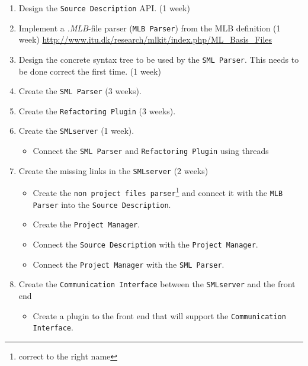 \documentclass[a4paper,oneside]{memoir}
\begin{document}
\begin{enumerate}
\item Design the \texttt{Source Description} API. (1 week)

\item Implement a \textit{.MLB}-file parser (\texttt{MLB Parser}) from the MLB
  definition (1 week) 
\url{http://www.itu.dk/research/mlkit/index.php/ML_Basis_Files}

\item Design the concrete syntax tree to be used by the \texttt{SML
    Parser}. This needs to be done correct the first time. (1 week)

\item Create the \texttt{SML Parser} (3 weeks).

\item Create the \texttt{Refactoring Plugin} (3 weeks).

\item Create the \texttt{SMLserver} (1 week).
  \begin{itemize}
  \item Connect the \texttt{SML Parser} and \texttt{Refactoring Plugin} using threads
  \end{itemize}

\item Create the missing links in the \texttt{SMLserver} (2 weeks)
  \begin{itemize}
  \item Create the \texttt{non project files parser}\footnote{correct to the
      right name} and connect it with the \texttt{MLB Parser} into the
    \texttt{Source Description}.

  \item Create the \texttt{Project Manager}.

  \item Connect the \texttt{Source Description} with the \texttt{Project
      Manager}.

  \item Connect the \texttt{Project Manager} with the \texttt{SML Parser}.
  \end{itemize}

\item Create the \texttt{Communication Interface} between the \texttt{SMLserver}
  and the front end
  \begin{itemize}
  \item Create a plugin to the front end that will support the
    \texttt{Communication Interface}.
  \end{itemize}
\end{enumerate}
\end{document}
